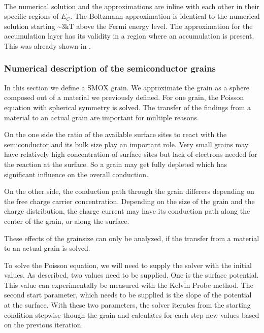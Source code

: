 \documentclass[11pt]{article}
\begin{document}
    \begin{center}
    \end{center}
    { \hspace*{\fill} \\}
    
    The numerical solution and the approximations are inline with each other
in their specific regions of \(E_C\). The Boltzmann approximation is
identical to the numerical solution starting \textasciitilde3kT above
the Fermi energy level. The approximation for the accumulation layer has
its validity in a region where an accumulation is present. This was
already shown in \cite{Barsan2011a}.

    \hypertarget{numerical-description-of-the-semiconductor-grains}{%
\subsubsection{Numerical description of the semiconductor
grains}\label{numerical-description-of-the-semiconductor-grains}}

In this section we define a SMOX grain. We approximate the grain as a
sphere composed out of a material we previously defined. For one grain,
the Poisson equation with spherical symmetry is solved. The transfer of
the findings from a material to an actual grain are important for
multiple reasons.

On the one side the ratio of the available surface sites to react with
the semiconductor and its bulk size play an important role. Very small
grains may have relatively high concentration of surface sites but lack
of electrons needed for the reaction at the surface. So a grain may get
fully depleted which has significant influence on the overall
conduction.

On the other side, the conduction path through the grain differers
depending on the free charge carrier concentration. Depending on the
size of the grain and the charge distribution, the charge current may
have its conduction path along the center of the grain, or along the
surface.

These effects of the grainsize can only be analyzed, if the transfer
from a material to an actual grain is solved.

To solve the Poisson equation, we will need to supply the solver with
the initial values. As described, two values need to be supplied. One is
the surface potential. This value can experimentally be measured with
the Kelvin Probe method. The second start parameter, which needs to be
supplied is the slope of the potential at the surface. With these two
parameters, the solver iterates from the starting condition stepwise
though the grain and calculates for each step new values based on the
previous iteration.
\end{document}
